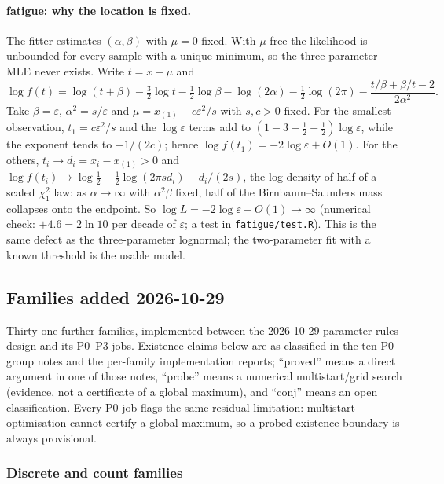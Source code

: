 \documentclass[11pt]{article}
\newcommand{\code}[1]{\texttt{#1}}
\theoremstyle{plain}
\theoremstyle{definition}
\theoremstyle{remark}
\begin{document}
\paragraph{fatigue: why the location is fixed.} The fitter estimates
$(\alpha,\beta)$ with $\mu = 0$ fixed. With $\mu$ free the likelihood is
unbounded for every sample with a unique minimum, so the three-parameter
MLE never exists. Write $t = x - \mu$ and
\[
  \log f(t) = \log(t+\beta) - \tfrac32\log t - \tfrac12\log\beta - \log(2\alpha)
  - \tfrac12\log(2\pi) - \frac{t/\beta + \beta/t - 2}{2\alpha^2}.
\]
Take $\beta = \varepsilon$, $\alpha^2 = s/\varepsilon$ and
$\mu = x_{(1)} - c\varepsilon^2/s$ with $s, c > 0$ fixed. For the smallest
observation, $t_1 = c\varepsilon^2/s$ and the $\log\varepsilon$ terms add to
$(1 - 3 - \tfrac12 + \tfrac12)\log\varepsilon$, while the exponent tends to
$-1/(2c)$; hence $\log f(t_1) = -2\log\varepsilon + O(1)$. For the others,
$t_i \to d_i = x_i - x_{(1)} > 0$ and
$\log f(t_i) \to \log\tfrac12 - \tfrac12\log(2\pi s d_i) - d_i/(2s)$, the
log-density of half of a scaled $\chi^2_1$ law: as $\alpha\to\infty$ with
$\alpha^2\beta$ fixed, half of the Birnbaum--Saunders mass collapses onto
the endpoint. So $\log L = -2\log\varepsilon + O(1) \to \infty$ (numerical
check: $+4.6 = 2\ln 10$ per decade of $\varepsilon$; a test in
\code{fatigue/test.R}). This is the same defect as the three-parameter
lognormal; the two-parameter fit with a known threshold is the usable model.

\subsection{Families added 2026-10-29}\label{sec:new-families}

Thirty-one further families, implemented between the 2026-10-29
parameter-rules design and its P0--P3 jobs. Existence claims below are as
classified in the ten P0 group notes and the per-family implementation
reports; ``proved'' means a direct argument in one of those notes, ``probe''
means a numerical multistart/grid search (evidence, not a certificate of a
global maximum), and ``conj'' means an open classification. Every P0 job
flags the same residual limitation: multistart optimisation cannot certify a
global maximum, so a probed existence boundary is always provisional.

\subsubsection*{Discrete and count families}
\end{document}
